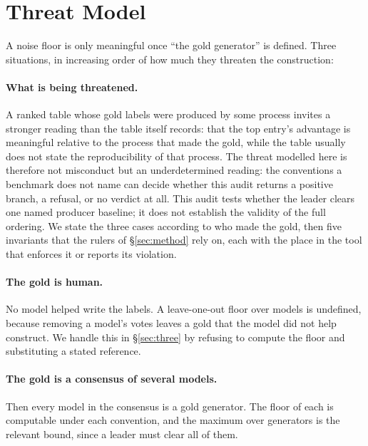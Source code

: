 \documentclass{article}
\begin{document}
\section{Threat Model}
\label{sec:threat} A noise floor is only meaningful once ``the gold generator'' is defined. Three situations, in increasing order of how much they threaten the construction:

\paragraph{What is being threatened.} A ranked table whose gold labels were produced by some process invites a stronger reading than the table itself records: that the top entry's advantage is meaningful relative to the process that made the gold, while the table usually does not state the reproducibility of that process. The threat modelled here is therefore not misconduct but an underdetermined reading: the conventions a benchmark does not name can decide whether this audit returns a positive branch, a refusal, or no verdict at all. This audit tests whether the leader clears one named producer baseline; it does not establish the validity of the full ordering. We state the three cases according to who made the gold, then five invariants that the rulers of \S\ref{sec:method} rely on, each with the place in the tool that enforces it or reports its violation.
\paragraph{The gold is human.} No model helped write the labels. A leave-one-out floor over models is undefined, because removing a model's votes leaves a gold that the model did not help construct. We handle this in \S\ref{sec:three} by refusing to compute the floor and substituting a stated reference.
\paragraph{The gold is a consensus of several models.} Then every model in the consensus is a gold generator. The floor of each is computable under each convention, and the maximum over generators is the relevant bound, since a leader must clear all of them.
\end{document}
